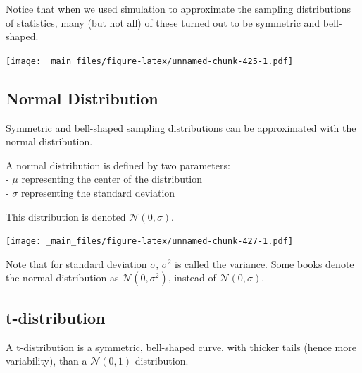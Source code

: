 \documentclass[]{book}
\begin{document}
Notice that when we used simulation to approximate the sampling
distributions of statistics, many (but not all) of these turned out to
be symmetric and bell-shaped.

\texttt{[image: \_main\_files/figure-latex/unnamed-chunk-425-1.pdf]}

\subsection{Normal Distribution}\label{normal-distribution}

Symmetric and bell-shaped sampling distributions can be approximated
with the normal distribution.

A normal distribution is defined by two parameters:\\
- \(\mu\) representing the center of the distribution\\
- \(\sigma\) representing the standard deviation

This distribution is denoted \(\mathcal{N}(0, \sigma)\).

\texttt{[image: \_main\_files/figure-latex/unnamed-chunk-427-1.pdf]}

Note that for standard deviation \(\sigma\), \(\sigma^2\) is called the
variance. Some books denote the normal distribution as
\(\mathcal{N}(0, \sigma^2)\), instead of \(\mathcal{N}(0,\sigma)\).

\subsection{t-distribution}\label{t-distribution}

A t-distribution is a symmetric, bell-shaped curve, with thicker tails
(hence more variability), than a \(\mathcal{N}(0,1)\) distribution.
\end{document}
